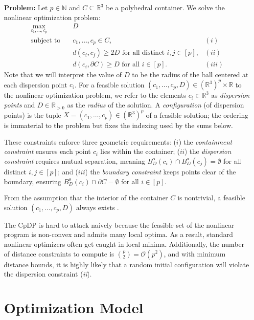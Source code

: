 \documentclass[preprint,12pt]{elsarticle}
\theoremstyle{remark}
\def \N {\mathbb{N}}
\def \R {\mathbb{R}}
\begin{document}
\textbf{Problem:} Let $p \in \N$ and $C \subseteq \R^3$ be a polyhedral
container. We solve the nonlinear optimization problem:
\begin{align*}
  \max_{c_1, \dots, c_p} \quad & D \\
  \text{subject to} \quad & c_1, \dots, c_p \in C, & (i) \\
  & d(c_i, c_j) \ge 2D \text{ for all distinct } i, j \in [p], & (ii) \\
  & d(c_i, \partial C) \ge D \text{ for all } i \in [p]. & (iii)
\end{align*}
Note that we will interpret the value of $D$ to be the radius of the ball
centered at each dispersion point $c_i$. For a feasible solution $(c_1, \dots,
c_p, D) \in (\R^3)^p \times \R$ to the nonlinear optimization problem, we refer
to the elements $c_i \in \R^3$ as \textit{dispersion points} and $D \in \R_{>
0}$ as the \textit{radius} of the solution. A \textit{configuration} (of
dispersion points) is the tuple $X = (c_1, \dots, c_p) \in (\R^3)^p$ of a
feasible solution; the ordering is immaterial to the problem but fixes the
indexing used by the sums below.

These constraints enforce three geometric requirements: ($i$) the
\textit{containment constraint} ensures each point $c_i$ lies within the
container; ($ii$) the \textit{dispersion constraint} requires mutual separation,
meaning $B_D^o(c_i) \cap B_D^o(c_j) = \emptyset$ for all distinct $i, j \in
[p]$; and ($iii$) the \textit{boundary constraint} keeps points clear of the
boundary, ensuring $B_D^o(c_i) \cap \partial C = \emptyset$ for all $i \in [p]$.

From the assumption that the interior of the container $C$ is nontrivial, a
feasible solution $(c_1, \dots, c_p, D)$ always exists \citep{dai2021}.

The CpDP is hard to attack naively because the feasible set of the nonlinear
program is non-convex and admits many local optima. As a result, standard
nonlinear optimizers often get caught in local minima. Additionally, the number
of distance constraints to compute is $\binom{p}2 = \mathcal{O}(p^2)$, and with
minimum distance bounds, it is highly likely that a random initial configuration
will violate the dispersion constraint (\textit{ii}).

\section{Optimization Model}
\end{document}
